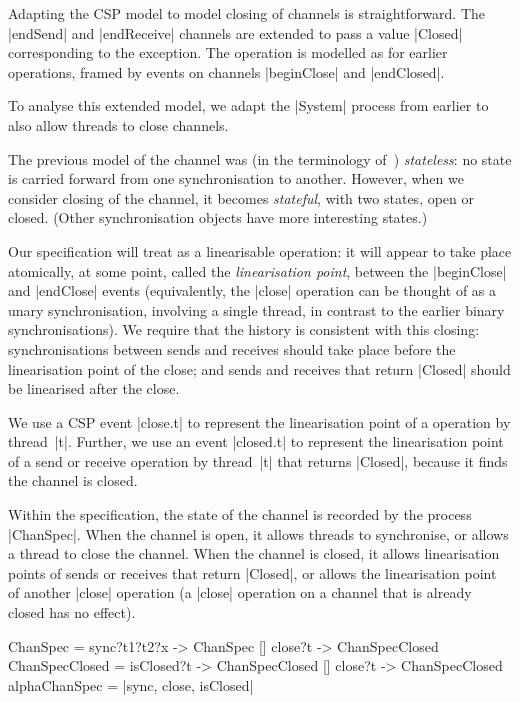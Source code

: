 
\inlineCSP

Adapting the CSP model to model closing of channels is straightforward.  The
|endSend| and |endReceive| channels are extended to pass a value |Closed|
corresponding to the  exception.  The  operation is
modelled as for earlier operations, framed by events on channels |beginClose|
and |endClosed|.


To analyse this extended model, we adapt the |System| process from earlier to
also allow threads to close channels.  

The previous model of the channel was (in the terminology
of~\cite{LL:synchronisation}) \emph{stateless}: no state is carried forward
from one synchronisation to another.  However, when we consider closing of the
channel, it becomes \emph{stateful}, with two states, open or closed.  (Other
synchronisation objects have more interesting states.)  

Our specification will treat  as a linearisable operation: it will
appear to take place atomically, at some point, called the \emph{linearisation
  point}, between the |beginClose| and |endClose| events (equivalently, the
|close| operation can be thought of as a unary synchronisation, involving a
single thread, in contrast to the earlier binary synchronisations).  We
require that the history is consistent with this closing: synchronisations
between sends and receives should take place before the linearisation point of
the close; and sends and receives that return |Closed| should be linearised
after the close.

We use a CSP event |close.t| to represent the linearisation point of a
 operation by thread~|t|.  Further, we use an event |closed.t| to
represent the linearisation point of a send or receive operation by thread~|t|
that returns |Closed|, because it finds the channel is closed.

Within the specification, the state of the channel is recorded by the process
|ChanSpec|.  When the channel is open, it allows threads to synchronise, or
allows a thread to close the channel.  When the channel is closed, it allows
linearisation points of sends or receives that return |Closed|, or allows the
linearisation point of another |close| operation (a |close| operation on a
channel that is already closed has no effect).
%
\begin{cspm}
ChanSpec = sync?t1?t2?x -> ChanSpec [] close?t -> ChanSpecClosed
ChanSpecClosed = isClosed?t -> ChanSpecClosed [] close?t -> ChanSpecClosed
alphaChanSpec = {|sync, close, isClosed|} 
\end{cspm}

